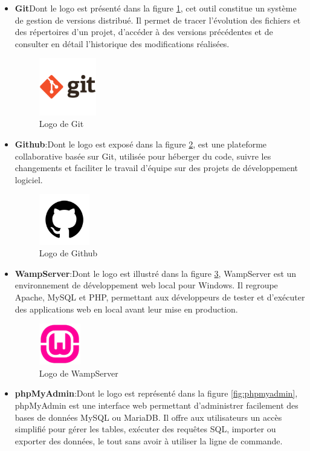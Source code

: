 \begin{itemize}
 \item \textbf{Git}Dont le logo est présenté dans la figure \ref{fig:git}, cet outil constitue un système de gestion de versions distribué. Il permet de tracer l’évolution des fichiers et des répertoires d’un projet, d’accéder à des versions précédentes et de consulter en détail l’historique des modifications réalisées.
 \begin{figure}[h]
    \centering
    \includegraphics[width=2.5cm]{images/git.png}
    \caption{Logo de Git}
    \label{fig:git}
\end{figure}
\item \textbf{Github}:Dont le logo est exposé dans la figure \ref{fig:gituhbl}, 
 est une plateforme collaborative basée sur Git, utilisée pour héberger du code, suivre les changements et faciliter le travail d’équipe sur des projets de développement logiciel.
 \begin{figure}[h]
    \centering
    \includegraphics[width=2.2cm]{images/githubl.png}
    \caption{Logo de Github}
    \label{fig:gituhbl}
\end{figure}
\item \textbf{WampServer}:Dont le logo est illustré dans la figure \ref{fig:wamp}, WampServer est un environnement de développement web local pour Windows. Il regroupe Apache, MySQL et PHP, permettant aux développeurs de tester et d’exécuter des applications web en local avant leur mise en production.
 \begin{figure}[h]
    \centering
    \includegraphics[width=1.8cm]{images/WampServer.png}
    \caption{Logo de WampServer}
    \label{fig:wamp}
\end{figure}
\item \textbf{phpMyAdmin}:Dont le logo est représenté dans la figure \ref{fig:phpmyadmin}, phpMyAdmin est une interface web permettant d’administrer facilement des bases de données MySQL ou MariaDB. Il offre aux utilisateurs un accès simplifié pour gérer les tables, exécuter des requêtes SQL, importer ou exporter des données, le tout sans avoir à utiliser la ligne de commande.

\end{itemize}
